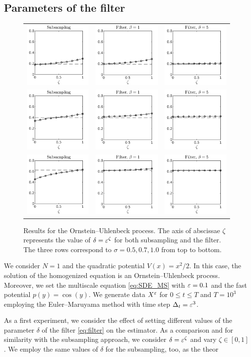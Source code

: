 \documentclass[10pt]{article}
\begin{document}
\subsection{Parameters of the filter}\label{sec:Num_Param}
\begin{figure}[t]
	\centering
	\begin{tabular}{ccc}
		\includegraphics[]{Figures/OUSubs_s5} & \includegraphics[]{Figures/OUFilt_s5_b1}  & \includegraphics[]{Figures/OUFilt_s5_b5} \\ %
		\includegraphics[]{Figures/OUSubs_s7} & \includegraphics[]{Figures/OUFilt_s7_b1}  & \includegraphics[]{Figures/OUFilt_s7_b5} \\ %
		\includegraphics[]{Figures/OUSubs_s10} & \includegraphics[]{Figures/OUFilt_s10_b1}  & \includegraphics[]{Figures/OUFilt_s10_b5} %
	\end{tabular}
	\caption{Results for the Ornstein--Uhlenbeck process. The axis of abscissae $\zeta$ represents the value of $\delta = \varepsilon^\zeta$ for both subsampling and the filter. The three rows correspond to $\sigma = 0.5, 0.7, 1.0$ from top to bottom.}
	\label{fig:OU}
\end{figure}
We consider $N = 1$ and the quadratic potential $V(x) = x^2/2$. In this case, the solution of the homogenized equation is an Ornstein--Uhlenbeck process. Moreover, we set the multiscale equation \eqref{eq:SDE_MS} with $\varepsilon = 0.1$ and the fast potential $p(y) = \cos(y)$. We generate data $X^\varepsilon$ for $0 \leq t \leq T$ and $T = 10^3$ employing the Euler--Maruyama method with time step $\Delta_t = \varepsilon^3$. 

As a first experiment, we consider the effect of setting different values of the parameter $\delta$ of the filter \eqref{eq:filter} on the estimator. As a comparison and for similarity with the subsampling approach, we consider $\delta = \varepsilon^{\zeta}$ and vary $\zeta \in [0, 1]$. We employ the same values of $\delta$ for the subsampling, too, as the theor
\end{document}
